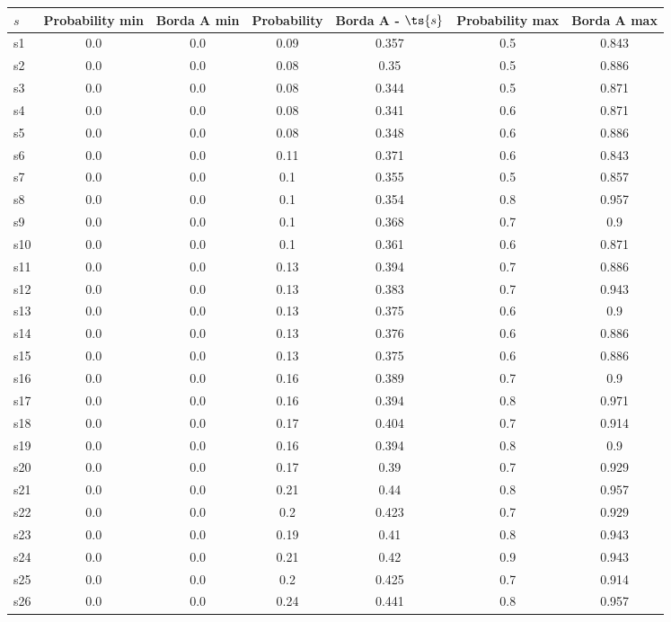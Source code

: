 \documentclass{article}
\begin{document}
\noindent\begin{tabular}{|l|c|c|c|c|c|c|}
\hline
$s$& Probability min & Borda A min & Probability & Borda A - $\ts{s}$ & Probability max & Borda A max\\
\hline
s1 &0.0 & 0.0 & 0.09 & 0.357 & 0.5 & 0.843\\
\hline
s2 &0.0 & 0.0 & 0.08 & 0.35 & 0.5 & 0.886\\
\hline
s3 &0.0 & 0.0 & 0.08 & 0.344 & 0.5 & 0.871\\
\hline
s4 &0.0 & 0.0 & 0.08 & 0.341 & 0.6 & 0.871\\
\hline
s5 &0.0 & 0.0 & 0.08 & 0.348 & 0.6 & 0.886\\
\hline
s6 &0.0 & 0.0 & 0.11 & 0.371 & 0.6 & 0.843\\
\hline
s7 &0.0 & 0.0 & 0.1 & 0.355 & 0.5 & 0.857\\
\hline
s8 &0.0 & 0.0 & 0.1 & 0.354 & 0.8 & 0.957\\
\hline
s9 &0.0 & 0.0 & 0.1 & 0.368 & 0.7 & 0.9\\
\hline
s10 &0.0 & 0.0 & 0.1 & 0.361 & 0.6 & 0.871\\
\hline
s11 &0.0 & 0.0 & 0.13 & 0.394 & 0.7 & 0.886\\
\hline
s12 &0.0 & 0.0 & 0.13 & 0.383 & 0.7 & 0.943\\
\hline
s13 &0.0 & 0.0 & 0.13 & 0.375 & 0.6 & 0.9\\
\hline
s14 &0.0 & 0.0 & 0.13 & 0.376 & 0.6 & 0.886\\
\hline
s15 &0.0 & 0.0 & 0.13 & 0.375 & 0.6 & 0.886\\
\hline
s16 &0.0 & 0.0 & 0.16 & 0.389 & 0.7 & 0.9\\
\hline
s17 &0.0 & 0.0 & 0.16 & 0.394 & 0.8 & 0.971\\
\hline
s18 &0.0 & 0.0 & 0.17 & 0.404 & 0.7 & 0.914\\
\hline
s19 &0.0 & 0.0 & 0.16 & 0.394 & 0.8 & 0.9\\
\hline
s20 &0.0 & 0.0 & 0.17 & 0.39 & 0.7 & 0.929\\
\hline
s21 &0.0 & 0.0 & 0.21 & 0.44 & 0.8 & 0.957\\
\hline
s22 &0.0 & 0.0 & 0.2 & 0.423 & 0.7 & 0.929\\
\hline
s23 &0.0 & 0.0 & 0.19 & 0.41 & 0.8 & 0.943\\
\hline
s24 &0.0 & 0.0 & 0.21 & 0.42 & 0.9 & 0.943\\
\hline
s25 &0.0 & 0.0 & 0.2 & 0.425 & 0.7 & 0.914\\
\hline
s26 &0.0 & 0.0 & 0.24 & 0.441 & 0.8 & 0.957\\

\end{tabular}
\end{document}
